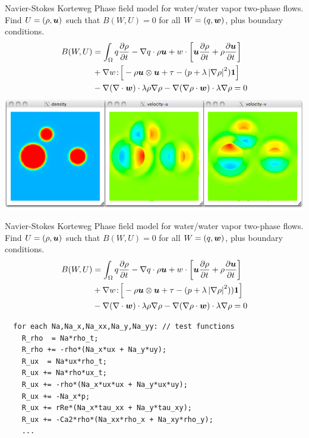 \begin{frame}[fragile,shrink=5]{Navier-Stokes Korteweg}
  Phase field model for water/water vapor two-phase flows.
  Find $U = (\rho,\bm u)$ such that $B(W,U) = 0$ for all $W = (q,\bm w)$, plus boundary conditions.
  \begin{equation*}
    \begin{split}
      B(W,U) &= \int_\Omega q \frac{\partial \rho}{\partial t} - \nabla q\cdot \rho\bm u
      + w\cdot \left[\bm u\frac{\partial\rho}{\partial t} + \rho\frac{\partial \bm u}{\partial t} \right] \\
      &+ \nabla w \!:\! \Big[ -\rho\bm u\otimes\bm u + \tau - (p + \lambda \left\lvert \nabla \rho \right\rvert^2)\bm 1 \Big] \\
      &- \nabla(\nabla\cdot\bm w)\cdot \lambda\rho\nabla\rho - \nabla(\nabla\rho\cdot\bm w)\cdot\lambda\nabla\rho = 0
    \end{split}
  \end{equation*}
  \includegraphics[width=\textwidth]{figures/NSK}
\end{frame}

\begin{frame}[fragile,shrink=5]{Navier-Stokes Korteweg}
  Phase field model for water/water vapor two-phase flows.
  Find $U = (\rho,\bm u)$ such that $B(W,U) = 0$ for all $W = (q,\bm w)$, plus boundary conditions.
  \begin{equation*}
    \begin{split}
      B(W,U) &= \int_\Omega q \frac{\partial \rho}{\partial t} - \nabla q\cdot \rho\bm u
      + w\cdot \left[\bm u\frac{\partial\rho}{\partial t} + \rho\frac{\partial \bm u}{\partial t} \right] \\
      &+ \nabla w \!:\! \Big[ -\rho\bm u\otimes\bm u + \tau - (p + \lambda \left\lvert \nabla \rho \right\rvert^2))\bm 1 \Big] \\
      &- \nabla(\nabla\cdot\bm w)\cdot \lambda\rho\nabla\rho - \nabla(\nabla\rho\cdot\bm w)\cdot\lambda\nabla\rho = 0
    \end{split}
  \end{equation*}
  \begin{verbatim}
  for each Na,Na_x,Na_xx,Na_y,Na_yy: // test functions
    R_rho  = Na*rho_t;
    R_rho += -rho*(Na_x*ux + Na_y*uy);
    R_ux  = Na*ux*rho_t;
    R_ux += Na*rho*ux_t;
    R_ux += -rho*(Na_x*ux*ux + Na_y*ux*uy);
    R_ux += -Na_x*p;
    R_ux += rRe*(Na_x*tau_xx + Na_y*tau_xy);
    R_ux += -Ca2*rho*(Na_xx*rho_x + Na_xy*rho_y);
    ...
  \end{verbatim}
\end{frame}

